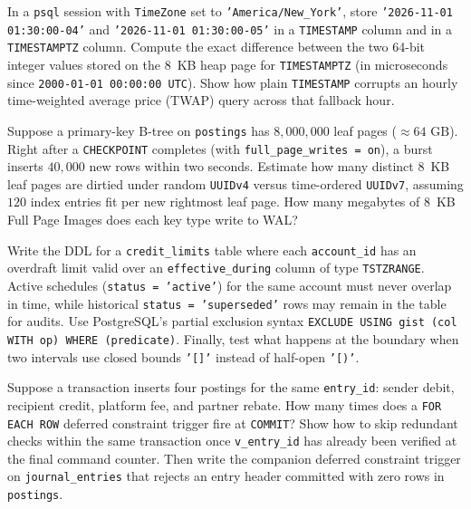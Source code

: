 \begin{exercise}
In a \texttt{psql} session with \texttt{TimeZone} set to
\texttt{'America/New\_York'}, store \texttt{'2026-11-01 01:30:00-04'} and
\texttt{'2026-11-01 01:30:00-05'} in a \texttt{TIMESTAMP} column and in a
\texttt{TIMESTAMPTZ} column. Compute the exact difference between the two 64-bit
integer values stored on the 8~KB heap page for \texttt{TIMESTAMPTZ} (in
microseconds since \texttt{2000-01-01 00:00:00 UTC}). Show how plain
\texttt{TIMESTAMP} corrupts an hourly time-weighted average price (TWAP) query
across that fallback hour.
\end{exercise}

\begin{exercise}
Suppose a primary-key B-tree on \texttt{postings} has $8{,}000{,}000$ leaf pages
($\approx 64\text{ GB}$). Right after a \texttt{CHECKPOINT} completes (with
\texttt{full\_page\_writes = on}), a burst inserts $40{,}000$ new rows within two
seconds. Estimate how many distinct 8~KB leaf pages are dirtied under random
\texttt{UUIDv4} versus time-ordered \texttt{UUIDv7}, assuming $120$ index entries
fit per new rightmost leaf page. How many megabytes of 8~KB Full Page Images does
each key type write to WAL?
\end{exercise}

\begin{exercise}
Write the DDL for a \texttt{credit\_limits} table where each \texttt{account\_id}
has an overdraft limit valid over an \texttt{effective\_during} column of type
\texttt{TSTZRANGE}. Active schedules (\texttt{status = 'active'}) for the same
account must never overlap in time, while historical \texttt{status = 'superseded'}
rows may remain in the table for audits. Use PostgreSQL's partial exclusion syntax
\texttt{EXCLUDE USING gist (col WITH op) WHERE (predicate)}. Finally, test what
happens at the boundary when two intervals use closed bounds \texttt{'[]'} instead
of half-open \texttt{'[)'}.
\end{exercise}

\begin{exercise}
Suppose a transaction inserts four postings for the same \texttt{entry\_id}: sender
debit, recipient credit, platform fee, and partner rebate. How many times does a
\texttt{FOR EACH ROW} deferred constraint trigger fire at \texttt{COMMIT}? Show how
to skip redundant checks within the same transaction once \texttt{v\_entry\_id} has
already been verified at the final command counter. Then write the companion
deferred constraint trigger on \texttt{journal\_entries} that rejects an entry
header committed with zero rows in \texttt{postings}.
\end{exercise}

